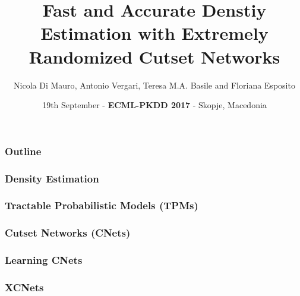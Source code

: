 \documentclass[xcolor={usenames,dvipsnames,svgnames}, compress]{beamer}
\begin{document}
\newlength{\custombulletheight}
\setlength{\custombulletheight}{\dimexpr0.5\ht1-0.5\ht2}

\title{Fast and Accurate Denstiy Estimation with Extremely Randomized
  Cutset Networks}
\author{Nicola  {Di Mauro}, Antonio  Vergari, Teresa M.A. Basile and Floriana Esposito}
\date{}
\date{19th September - \textbf{ECML-PKDD 2017} - Skopje, Macedonia}


{
  \begin{frame}
    \titlepage
  \end{frame}
}

\begin{frame}[t]
  \frametitle{Outline}
  
\end{frame}


\begin{frame}[t]
  \frametitle{Density Estimation}
  
\end{frame}

\begin{frame}[t]
  \frametitle{Tractable Probabilistic Models (TPMs)}
  
\end{frame}

\begin{frame}[t]
  \frametitle{Cutset Networks (CNets)}
  
\end{frame}

\begin{frame}[t]
  \frametitle{Learning CNets}
  
\end{frame}

\begin{frame}[t]
  \frametitle{XCNets}
  
\end{frame}
\end{document}
